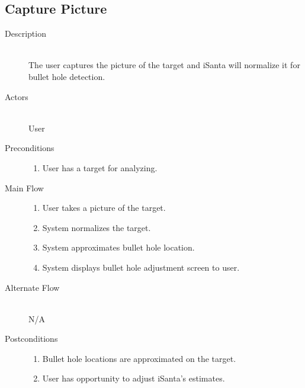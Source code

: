 \subsection{Capture Picture}
\begin{description}
    \item[Description] \hfill \\
        The user captures the picture of the target and iSanta will normalize it for bullet hole detection.
    \item[Actors] \hfill \\
        User
    \item[Preconditions] \hfill 
        \begin{enumerate}
            \item User has a target for analyzing.
        \end{enumerate}
    \item[Main Flow] \hfill 
        \begin{enumerate}
            \item User takes a picture of the target.
            \item System normalizes the target.
            \item System approximates bullet hole location.
            \item System displays bullet hole adjustment screen to user.
        \end{enumerate}
    \item[Alternate Flow] \hfill \\
        N/A
    \item[Postconditions]
        \begin{enumerate}
            \item Bullet hole locations are approximated on the target.
            \item User has opportunity to adjust iSanta's estimates.
        \end{enumerate} 
\end{description}
\myspace

